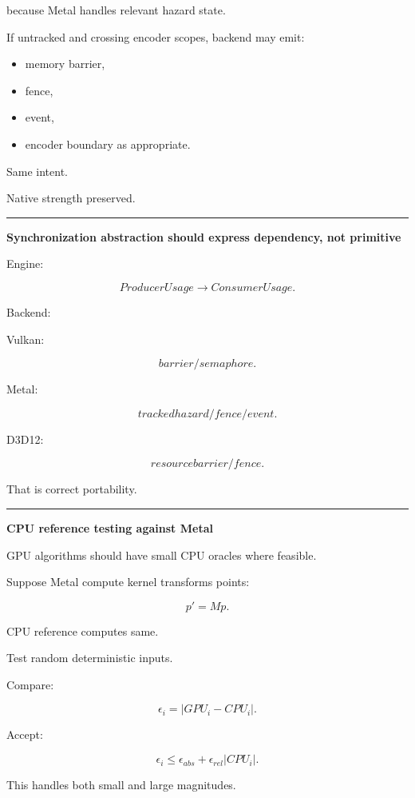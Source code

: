 because Metal handles relevant hazard state.

If untracked and crossing encoder scopes, backend may emit:

\begin{itemize}
\tightlist
\item
  memory barrier,
\item
  fence,
\item
  event,
\item
  encoder boundary as appropriate.
\end{itemize}

Same intent.

Native strength preserved.

\begin{center}\rule{0.5\linewidth}{0.5pt}\end{center}

\textbf{Synchronization abstraction should express dependency, not primitive}

Engine:

\[
ProducerUsage
\rightarrow
ConsumerUsage.
\]

Backend:

Vulkan:

\[
barrier/semaphore.
\]

Metal:

\[
tracked hazard/fence/event.
\]

D3D12:

\[
resource barrier/fence.
\]

That is correct portability.

\begin{center}\rule{0.5\linewidth}{0.5pt}\end{center}

\textbf{CPU reference testing against Metal}

GPU algorithms should have small CPU oracles where feasible.

Suppose Metal compute kernel transforms points:

\[
p'=Mp.
\]

CPU reference computes same.

Test random deterministic inputs.

Compare:

\[
\epsilon_i=
|GPU_i-CPU_i|.
\]

Accept:

\[
\epsilon_i
\le
\epsilon_{abs}
+
\epsilon_{rel}|CPU_i|.
\]

This handles both small and large magnitudes.

